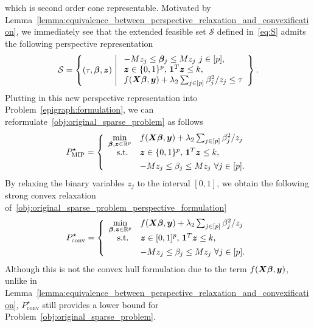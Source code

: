 which is second order cone representable.
Motivated by Lemma~\ref{lemma:equivalence_between_perspective_relaxation_and_convexification}, we immediately see that the extended feasible set $\mathcal S$ defined in~\eqref{eq:S} admits the following perspective representation
\begin{align*}
    \mathcal{S} = \left\{ (\tau, \bm{\beta}, \bm{z})  \;\middle|\;
    \begin{array}{l} 
        -M z_j\leq \bm{\beta}_j \leq M z_j ~ j \in [p], \\
        \bm{z} \in \{0, 1\}^p, \, \mathbf{1}^T \bm{z} \leq k,  \\
        f(\bm{X} \bm{\beta}, \bm{y}) + \lambda_2 \sum_{j \in [p]} \beta_j^2 / z_j \leq \tau
    \end{array}
    \right\}.
\end{align*}
Plutting in this new perspective representation into Problem~\eqref{epigraph:formulation}, we can reformulate~\eqref{obj:original_sparse_problem} as follows
\begin{align}
    \label{obj:original_sparse_problem_perspective_formulation}
    P_{\text{MIP}}^\star = \left\{
    \begin{array}{cll}
        \min\limits_{\bm{\beta}, \bm{z} \in \mathbb{R}^p} & f(\bm{X} \bm{\beta}, \bm{y}) + \lambda_2 \sum_{j \in [p]} {\beta_j^2}/{z_j} \\[1ex]
        \text{\; s.t.} & \bm{z} \in \{0, 1\}^p, \, \mathbf{1}^T \bm{z} \leq k, \\[1ex]
        & -M z_j \leq \beta_j \leq M z_j ~ \forall j \in [p].
    \end{array}
    \right.
\end{align}
By relaxing the binary variables $z_j$ to the interval $[0, 1]$, we obtain the following strong convex relaxation of~\eqref{obj:original_sparse_problem_perspective_formulation}
\begin{align}
    \label{obj:original_sparse_problem_perspective_formulation_convex_relaxation}
    P_{\text{conv}}^\star = \left\{
    \begin{array}{cll}
        \min\limits_{\bm{\beta}, \bm{z} \in \mathbb{R}^p} & f(\bm{X} \bm{\beta}, \bm{y}) + \lambda_2 \sum_{j \in [p]} {\beta_j^2}/{z_j} \\[1ex]
        \text{\; s.t.} & \bm{z} \in [0, 1]^p, \, \mathbf{1}^T \bm{z} \leq k, \\[1ex]
        & -M z_j \leq \beta_j \leq M z_j ~ \forall j \in [p].
    \end{array}
    \right.
\end{align}
Although this is not the convex hull formulation due to the term $f(\bm{X} \bm{\beta}, \bm{y})$, unlike in Lemma~\ref{lemma:equivalence_between_perspective_relaxation_and_convexification}, $P^\star_{\text{conv}}$ still provides a lower bound for Problem~\eqref{obj:original_sparse_problem}.


